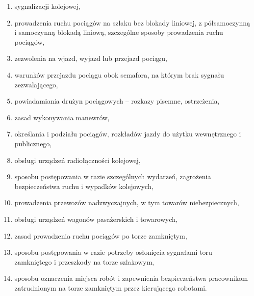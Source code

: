 \documentclass[usenames,dvipsnames,svgnames,table,a4paper,openany,justified]{tufte-book}
\begin{document}
\begin{enumerate}
\begin{enumerate}
\begin{enumerate}
 			\item sygnalizacji kolejowej,
 			\item prowadzenia ruchu pociągów na szlaku bez blokady liniowej, z półsamoczynną i
 			samoczynną blokadą liniową, szczególne sposoby prowadzenia ruchu pociągów,
 			\item zezwolenia na wjazd, wyjazd lub przejazd pociągu,
 			\item warunków przejazdu pociągu obok semafora, na którym brak sygnału zezwalającego,
 			\item powiadamiania drużyn pociągowych – rozkazy pisemne, ostrzeżenia,
 			\item zasad wykonywania manewrów,
 			\item określania i podziału pociągów, rozkładów jazdy do użytku wewnętrznego i publicznego,
 			\item obsługi urządzeń radiołączności kolejowej, 
 			\item sposobu postępowania w razie szczególnych wydarzeń, zagrożenia bezpieczeństwa
 			ruchu i wypadków kolejowych,
 			\item prowadzenia przewozów nadzwyczajnych, w tym towarów niebezpiecznych,
 			\item obsługi urządzeń wagonów pasażerskich i towarowych,
 			\item zasad prowadzenia ruchu pociągów po torze zamkniętym,
 			\item sposobu postępowania w razie potrzeby osłonięcia sygnałami toru zamkniętego i
 			przeszkody na torze szlakowym,
 			\item sposobu oznaczenia miejsca robót i zapewnienia bezpieczeństwa pracownikom
 			zatrudnionym na torze zamkniętym przez kierującego robotami.
 			\end{enumerate}
 	\end{enumerate}
\end{enumerate}
\end{document}
